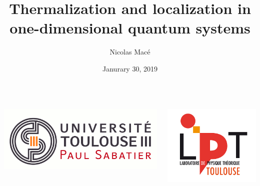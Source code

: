 \begin{frame}
\title{Thermalization and localization in one-dimensional quantum systems}

\author{Nicolas Macé}

\date{Janurary 30, 2019}

\titlepage

\btVFill
\begin{columns}
  \begin{column}{2cm}
    \centering
    \includegraphics[width=\columnwidth]{img/title/logo-ups.png}
  \end{column}
  \begin{column}{2cm}
    \centering
    \includegraphics[width=\columnwidth]{img/title/LPT-LOGO_RVB.jpg}
  \end{column}
\end{columns}
\end{frame}

